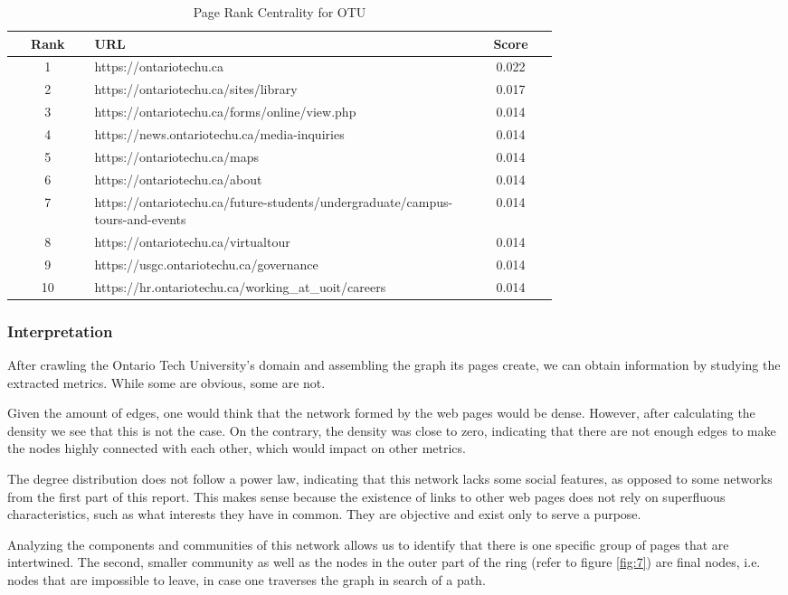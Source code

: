 \begin{table}
    \centering
    \begin{tabular}{|c|p{0.7\linewidth}|c|}
        \hline
        \textbf{Rank} & \textbf{URL} & \textbf{Score} \\
        \hline
        1 & https://ontariotechu.ca & 0.022 \\ \hline
        2 & https://ontariotechu.ca/sites/library & 0.017 \\ \hline
        3 & https://ontariotechu.ca/forms/online/view.php & 0.014 \\ \hline
        4 & https://news.ontariotechu.ca/media-inquiries & 0.014 \\ \hline
        5 & https://ontariotechu.ca/maps & 0.014 \\ \hline
        6 & https://ontariotechu.ca/about & 0.014 \\ \hline
        7 & https://ontariotechu.ca/future-students/undergraduate/campus-tours-and-events & 0.014 \\ \hline
        8 & https://ontariotechu.ca/virtualtour & 0.014 \\ \hline
        9 & https://usgc.ontariotechu.ca/governance & 0.014 \\ \hline
        10 & https://hr.ontariotechu.ca/working\_at\_uoit/careers & 0.014 \\ \hline
    \end{tabular}
    \caption{Page Rank Centrality for OTU}
    \label{table:otu_page_rank}
\end{table}

\subsubsection{Interpretation}
After crawling the Ontario Tech University's domain and assembling the graph its pages create, we can obtain information by studying the extracted metrics. While some are obvious, some are not.

Given the amount of edges, one would think that the network formed by the web pages would be dense. However, after calculating the density we see that this is not the case. On the contrary, the density was close to zero, indicating that there are not enough edges to make the nodes highly connected with each other, which would impact on other metrics.

The degree distribution does not follow a power law, indicating that this network lacks some social features, as opposed to some networks from the first part of this report. This makes sense because the existence of links to other web pages does not rely on superfluous characteristics, such as what interests they have in common. They are objective and exist only to serve a purpose.

Analyzing the components and communities of this network allows us to identify that there is one specific group of pages that are intertwined. The second, smaller community as well as the nodes in the outer part of the ring (refer to figure \ref{fig:7}) are final nodes, i.e. nodes that are impossible to leave, in case one traverses the graph in search of a path.